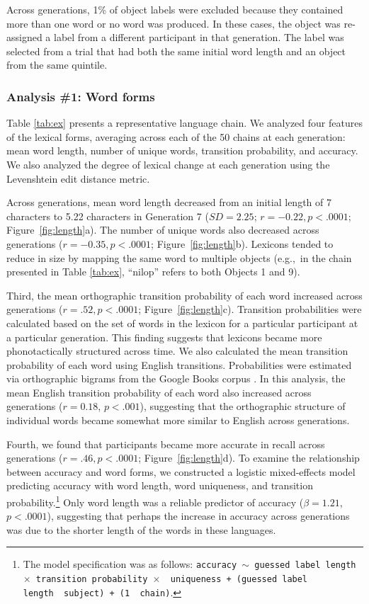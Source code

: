 Across generations, 1\% of object labels were excluded because they contained more than one word or no word was produced. In these cases, the object was re-assigned a label from a different participant in that generation. The label was selected from a trial that had both the same initial word length and an object from the same quintile. 

\subsubsection{Analysis \#1: Word forms}


Table \ref{tab:ex} presents a representative language chain. We analyzed four features of the lexical forms, averaging across each of the 50 chains at each generation: mean word length, number of unique words, transition probability, and accuracy. We also analyzed the degree of lexical change at each generation using the Levenshtein edit distance metric.

Across generations, mean word length decreased from an initial length of 7 characters to 5.22 characters in Generation 7 ($SD= 2.25$; $r=-0.22, p<.0001$; Figure\ \ref{fig:length}a). The number of unique words also decreased across generations ($r=-0.35, p<.0001$; Figure\ \ref{fig:length}b). Lexicons tended to reduce in size by mapping the same word to multiple objects (e.g.,\ in the chain presented in Table \ref{tab:ex}, ``nilop'' refers to both Objects 1 and 9).



Third, the mean orthographic transition probability of each word increased across generations ($r=.52, p<.0001$; Figure\ \ref{fig:length}c). Transition probabilities were calculated based on the set of words in the lexicon for a particular participant at a particular generation. This finding suggests that lexicons became more phonotactically structured across time. We also calculated the mean transition probability of each word using English transitions. Probabilities were estimated via orthographic bigrams from the Google Books corpus \cite{norvig}. In this analysis, the mean English transition probability of each word also increased across generations ($r=0.18$, $p <.001$), suggesting that the orthographic structure of individual words became somewhat more similar to English across generations. %


Fourth, we found that participants became more accurate in recall across generations ($r=.46, p<.0001$; Figure\ \ref{fig:length}d). To examine the relationship between accuracy and word forms, we constructed a logistic mixed-effects model predicting accuracy with word length, word uniqueness, and transition probability.\footnote{The model specification was as follows: \texttt{accuracy $\sim$ guessed label length~$\times$~transition probability~$\times$~ uniqueness + (guessed label length~\textbar~subject) +  (1~\textbar~chain)}.} Only word length was a reliable predictor of accuracy ($\beta=1.21$, $p <.0001$), suggesting that perhaps the increase in accuracy across generations was due to the shorter length of the words in these languages. %


